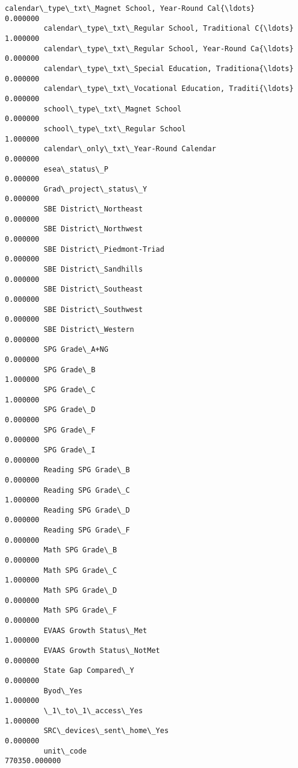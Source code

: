 \documentclass[11pt]{article}
\begin{document}
\begin{Verbatim}[commandchars=\\\{\}]
         calendar\_type\_txt\_Magnet School, Year-Round Cal{\ldots}       0.000000   
         calendar\_type\_txt\_Regular School, Traditional C{\ldots}       1.000000   
         calendar\_type\_txt\_Regular School, Year-Round Ca{\ldots}       0.000000   
         calendar\_type\_txt\_Special Education, Traditiona{\ldots}       0.000000   
         calendar\_type\_txt\_Vocational Education, Traditi{\ldots}       0.000000   
         school\_type\_txt\_Magnet School                            0.000000   
         school\_type\_txt\_Regular School                           1.000000   
         calendar\_only\_txt\_Year-Round Calendar                    0.000000   
         esea\_status\_P                                            0.000000   
         Grad\_project\_status\_Y                                    0.000000   
         SBE District\_Northeast                                   0.000000   
         SBE District\_Northwest                                   0.000000   
         SBE District\_Piedmont-Triad                              0.000000   
         SBE District\_Sandhills                                   0.000000   
         SBE District\_Southeast                                   0.000000   
         SBE District\_Southwest                                   0.000000   
         SBE District\_Western                                     0.000000   
         SPG Grade\_A+NG                                           0.000000   
         SPG Grade\_B                                              1.000000   
         SPG Grade\_C                                              1.000000   
         SPG Grade\_D                                              0.000000   
         SPG Grade\_F                                              0.000000   
         SPG Grade\_I                                              0.000000   
         Reading SPG Grade\_B                                      0.000000   
         Reading SPG Grade\_C                                      1.000000   
         Reading SPG Grade\_D                                      0.000000   
         Reading SPG Grade\_F                                      0.000000   
         Math SPG Grade\_B                                         0.000000   
         Math SPG Grade\_C                                         1.000000   
         Math SPG Grade\_D                                         0.000000   
         Math SPG Grade\_F                                         0.000000   
         EVAAS Growth Status\_Met                                  1.000000   
         EVAAS Growth Status\_NotMet                               0.000000   
         State Gap Compared\_Y                                     0.000000   
         Byod\_Yes                                                 1.000000   
         \_1\_to\_1\_access\_Yes                                       1.000000   
         SRC\_devices\_sent\_home\_Yes                                0.000000   
         unit\_code                                           770350.000000   
         

\end{Verbatim}
\end{document}

